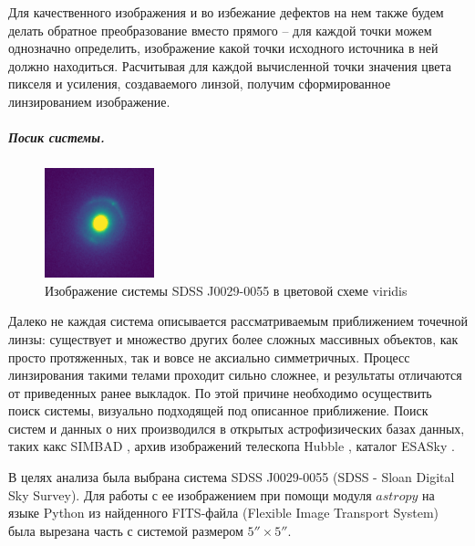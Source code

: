 \documentclass[12pt,a4paper]{article}
\begin{document}
Для качественного изображения и во избежание дефектов на нем также будем делать обратное преобразование вместо прямого -- для каждой точки можем однозначно определить, изображение какой точки исходного источника в ней должно находиться. 
Расчитывая для каждой вычисленной точки значения цвета пикселя и усиления, создаваемого линзой, получим сформированное линзированием изображение.

\subparagraph*{Посик системы.} 
\begin{figure}
    \centering
    \includegraphics[width=0.9\linewidth]{sources/sdssj0029-0055.png}
    \caption{\small Изображение системы SDSS J0029-0055 в цветовой схеме viridis}
\end{figure}
Далеко не каждая система описывается рассматриваемым приближением точечной линзы: существует и множество других более сложных массивных объектов, как просто протяженных, так и вовсе не аксиально симметричных.
Процесс линзирования такими телами проходит сильно сложнее, и результаты отличаются от приведенных ранее выкладок.
По этой причине необходимо осуществить поиск системы, визуально подходящей под описанное приближение. 
Поиск систем и данных о них производился в открытых астрофизических базах данных, таких какс SIMBAD \cite{simbad}, архив изображений телескопа Hubble \cite{hubble}, каталог ESASky \cite{esasky}.

В целях анализа была выбрана система SDSS J0029-0055 (SDSS - Sloan Digital Sky Survey).
Для работы с ее изображением при помощи модуля $astropy$ на языке Python из найденного FITS-файла (Flexible Image Transport System) была вырезана часть с системой размером  $5'' \times 5''$.
\end{document}
